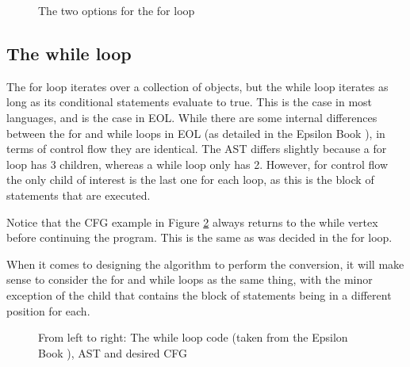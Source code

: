 \begin{figure}
\centering
\begin{minipage}{.3\textwidth}
  \centering
\end{minipage}
\begin{minipage}{.3\textwidth}
  \centering
\end{minipage}
\caption{The two options for the for loop}
\label{fig:forOptions}
\end{figure}

\subsection{The while loop}

The for loop iterates over a collection of objects, but the while loop iterates as long as its conditional statements evaluate to true. This is the case in most languages, and is the case in EOL. While there are some internal differences between the for and while loops in EOL (as detailed in the Epsilon Book \citep{epsilonBook}), in terms of control flow they are identical. The AST differs slightly because a for loop has 3 children, whereas a while loop only has 2. However, for control flow the only child of interest is the last one for each loop, as this is the block of statements that are executed.

Notice that the CFG example in Figure \ref{fig:while} always returns to the while vertex before continuing the program. This is the same as was decided in the for loop.

When it comes to designing the algorithm to perform the conversion, it will make sense to consider the for and while loops as the same thing, with the minor exception of the child that contains the block of statements being in a different position for each.

\begin{figure}
\centering
\begin{minipage}{.3\textwidth}
  \centering
  
\end{minipage}%
\begin{minipage}{.3\textwidth}
  \centering
\end{minipage}
\begin{minipage}{.3\textwidth}
  \centering
\end{minipage}
\caption{From left to right: The while loop code (taken from the Epsilon Book \cite{epsilonBook}), AST and desired CFG}
\label{fig:while}
\end{figure}

